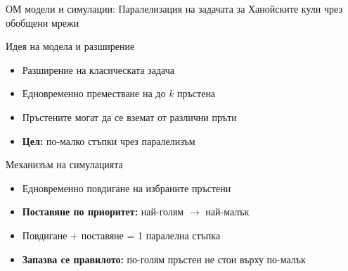 \documentclass[aspectratio=169]{beamer}
\begin{document}
\begin{frame}{ОМ модели и симулации: Паралелизация на задачата за Ханойските кули чрез обобщени мрежи}
    
    \begin{block}{Идея на модела и разширение}
        \begin{itemize}
            \item Разширение на класическата задача
            \item Едновременно преместване на до $k$ пръстена
            \item Пръстените могат да се вземат от различни пръти
            \item \textbf{Цел:} по-малко стъпки чрез паралелизъм
        \end{itemize}
    \end{block}

    \vspace{0.1cm}

    \begin{block}{Механизъм на симулацията}
        \begin{itemize}
            \item Едновременно повдигане на избраните пръстени
            \item \textbf{Поставяне по приоритет:} най-голям $\rightarrow$ най-малък
            \item Повдигане + поставяне = 1 паралелна стъпка
            \item \textbf{Запазва се правилото:} по-голям пръстен не стои върху по-малък
        \end{itemize}
    \end{block}
\end{frame}
\end{document}
